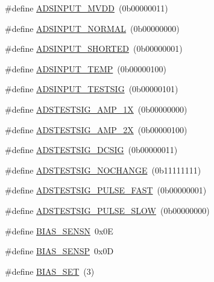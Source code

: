 \begin{DoxyCompactItemize}
\item 
\#define \hyperlink{group__Definitions__ADS1299_gaca41b0b85d6a23cdf5d528ccb1ddd745}{A\+D\+S\+I\+N\+P\+U\+T\+\_\+\+M\+V\+DD}~(0b00000011)
\item 
\#define \hyperlink{group__Definitions__ADS1299_ga79a404120ad83a16e3ae5604e1d574c7}{A\+D\+S\+I\+N\+P\+U\+T\+\_\+\+N\+O\+R\+M\+AL}~(0b00000000)
\item 
\#define \hyperlink{group__Definitions__ADS1299_gaf4819c6799cebfab368ca7aca44dbb61}{A\+D\+S\+I\+N\+P\+U\+T\+\_\+\+S\+H\+O\+R\+T\+ED}~(0b00000001)
\item 
\#define \hyperlink{group__Definitions__ADS1299_ga835a4b6ea1a22c4b8021e0d47a43344a}{A\+D\+S\+I\+N\+P\+U\+T\+\_\+\+T\+E\+MP}~(0b00000100)
\item 
\#define \hyperlink{group__Definitions__ADS1299_ga8894379ee3e97a0e296d0201fe75c1b8}{A\+D\+S\+I\+N\+P\+U\+T\+\_\+\+T\+E\+S\+T\+S\+IG}~(0b00000101)
\item 
\#define \hyperlink{group__Definitions__ADS1299_ga73acc481619d255e7652ccfa148f50a1}{A\+D\+S\+T\+E\+S\+T\+S\+I\+G\+\_\+\+A\+M\+P\+\_\+1X}~(0b00000000)
\item 
\#define \hyperlink{group__Definitions__ADS1299_ga512bb26913d49e4d6fc2c7f271b0964d}{A\+D\+S\+T\+E\+S\+T\+S\+I\+G\+\_\+\+A\+M\+P\+\_\+2X}~(0b00000100)
\item 
\#define \hyperlink{group__Definitions__ADS1299_gabbd58fa66fd5f8ccb4310e4f59afd3d9}{A\+D\+S\+T\+E\+S\+T\+S\+I\+G\+\_\+\+D\+C\+S\+IG}~(0b00000011)
\item 
\#define \hyperlink{group__Definitions__ADS1299_ga7141f22cf9ee75a5a97d6230621ce273}{A\+D\+S\+T\+E\+S\+T\+S\+I\+G\+\_\+\+N\+O\+C\+H\+A\+N\+GE}~(0b11111111)
\item 
\#define \hyperlink{group__Definitions__ADS1299_gadfb3a042d1cb163c324f7c2422a81bd0}{A\+D\+S\+T\+E\+S\+T\+S\+I\+G\+\_\+\+P\+U\+L\+S\+E\+\_\+\+F\+A\+ST}~(0b00000001)
\item 
\#define \hyperlink{group__Definitions__ADS1299_ga6825c7210e0be635b9f9db381133900b}{A\+D\+S\+T\+E\+S\+T\+S\+I\+G\+\_\+\+P\+U\+L\+S\+E\+\_\+\+S\+L\+OW}~(0b00000000)
\item 
\#define \hyperlink{group__Definitions__ADS1299_gac8197f544e39562ab0b4e67ad7d4410b}{B\+I\+A\+S\+\_\+\+S\+E\+N\+SN}~0x0E
\item 
\#define \hyperlink{group__Definitions__ADS1299_gadee1ef2aa548da6eb85a1f103bd50471}{B\+I\+A\+S\+\_\+\+S\+E\+N\+SP}~0x0D
\item 
\#define \hyperlink{group__Definitions__ADS1299_gaa24e8cc3ecb302b3430bdd9def28fef2}{B\+I\+A\+S\+\_\+\+S\+ET}~(3)

\end{DoxyCompactItemize}
